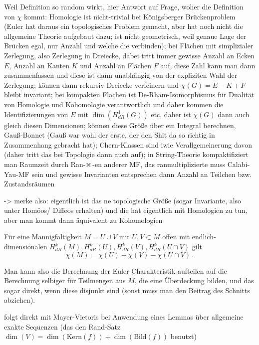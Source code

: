 \documentclass[../H_Analysis_main.tex]{subfiles}
\begin{document}
Weil Definition so random wirkt, hier Antwort auf Frage, woher die Definition von $\chi$ kommt: Homologie ist nicht-trivial bei Königsberger Brückenproblem (Euler hat daraus ein topologisches Problem gemacht, aber hat noch nicht die allgemeine Theorie aufgebaut dazu; ist nicht geometrisch, weil genaue Lage der Brücken egal, nur Anzahl und welche die verbinden); bei Flächen mit simplizialer Zerlegung, also Zerlegung in Dreiecke, dabei tritt immer gewisse Anzahl an Ecken $E$, Anzahl an Kanten $K$ und Anzahl an Flächen $F$ auf, diese Zahl kann man dann zusammenfassen und diese ist dann unabhängig von der expliziten Wahl der Zerlegung; können dann rekursiv Dreiecke verfeinern und $\chi(G) = E - K + F$ bleibt invariant; bei kompakten Flächen ist De-Rham-Isomorphismus für Dualität von Homologie und Kohomologie verantwortlich und daher kommen die Identifizierungen von $E$ mit $\dim(H_{dR}^1(G))$ etc, daher ist $\chi(G)$ dann auch gleich diesen Dimensionen; können diese Größe über ein Integral berechnen, Gauß-Bonnet (Gauß war wohl der erste, der den Shit da so richtig in Zusammenhang gebracht hat); Chern-Klassen sind iwie Verallgemeinerung davon (daher tritt das bei Topologie dann auch auf); in String-Theorie kompaktifiziert man Raumzeit durch Ran-$\cross$-en anderer MF, das ranmultiplizierte muss Calabi-Yau-MF sein und gewisse Invarianten entsprechen dann Anzahl an Teilchen bzw. Zustandsräumen

-> merke also: eigentlich ist das ne topologische Größe (sogar Invariante, also unter Homöos/ Diffeos erhalten) und die hat eigentlich mit Homologien zu tun, aber man kommt dann äquivalent zu Kohomologien

\begin{lemma}
Für eine Mannigfaltigkeit $M = U \cup V$ mit $U, V \subset M$ offen mit endlich-dimensionalen $H_{dR}^k(M), H_{dR}^k(U), H_{dR}^k(V), H_{dR}^k(U \cap V)$ gilt
\begin{equation}
\chi(M) = \chi(U) + \chi(V) - \chi(U \cap V) \, .
\end{equation}
\end{lemma}
Man kann also die Berechnung der Euler-Charakteristik aufteilen auf die Berechnung selbiger für Teilmengen aus $M$, die eine Überdeckung bilden, und das sogar direkt, wenn diese disjunkt sind (sonst muss man den Beitrag des Schnitts abziehen).

folgt direkt mit Mayer-Vietoris bei Anwendung eines Lemmas über allgemeine exakte Sequenzen (das den Rand-Satz $\dim(V) = \dim(\text{Kern}(f)) + \dim(\text{Bild}(f))$ benutzt)
\end{document}
